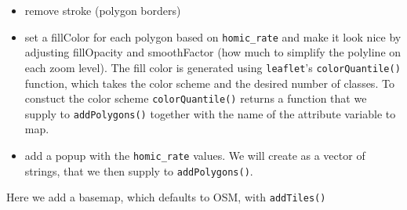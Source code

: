 \documentclass[
]{book}
\newenvironment{Shaded}{\begin{snugshade}}{\end{snugshade}}
\newcommand{\AttributeTok}[1]{\textcolor[rgb]{0.13,0.29,0.53}{#1}}
\newcommand{\CommentTok}[1]{\textcolor[rgb]{0.56,0.35,0.01}{\textit{#1}}}
\newcommand{\ConstantTok}[1]{\textcolor[rgb]{0.56,0.35,0.01}{#1}}
\newcommand{\DecValTok}[1]{\textcolor[rgb]{0.00,0.00,0.81}{#1}}
\newcommand{\FloatTok}[1]{\textcolor[rgb]{0.00,0.00,0.81}{#1}}
\newcommand{\FunctionTok}[1]{\textcolor[rgb]{0.13,0.29,0.53}{\textbf{#1}}}
\newcommand{\NormalTok}[1]{#1}
\newcommand{\OtherTok}[1]{\textcolor[rgb]{0.56,0.35,0.01}{#1}}
\newcommand{\SpecialCharTok}[1]{\textcolor[rgb]{0.81,0.36,0.00}{\textbf{#1}}}
\newcommand{\StringTok}[1]{\textcolor[rgb]{0.31,0.60,0.02}{#1}}
\providecommand{\tightlist}{%
  \setlength{\itemsep}{0pt}\setlength{\parskip}{0pt}}
\begin{document}
\begin{itemize}
\tightlist
\item
  remove stroke (polygon borders)\\
\item
  set a fillColor for each polygon based on \texttt{homic\_rate} and make it look nice by adjusting fillOpacity and smoothFactor (how much to simplify the polyline on each zoom level). The fill color is generated using \texttt{leaflet}'s \texttt{colorQuantile()} function, which takes the color scheme and the desired number of classes. To constuct the color scheme \texttt{colorQuantile()} returns a function that we supply to \texttt{addPolygons()} together with the name of the attribute variable to map.\\
\item
  add a popup with the \texttt{homic\_rate} values. We will create as a vector of strings, that we then supply to \texttt{addPolygons()}.
\end{itemize}

\begin{Shaded}
\end{Shaded}

Here we add a basemap, which defaults to OSM, with \texttt{addTiles()}
\end{document}
